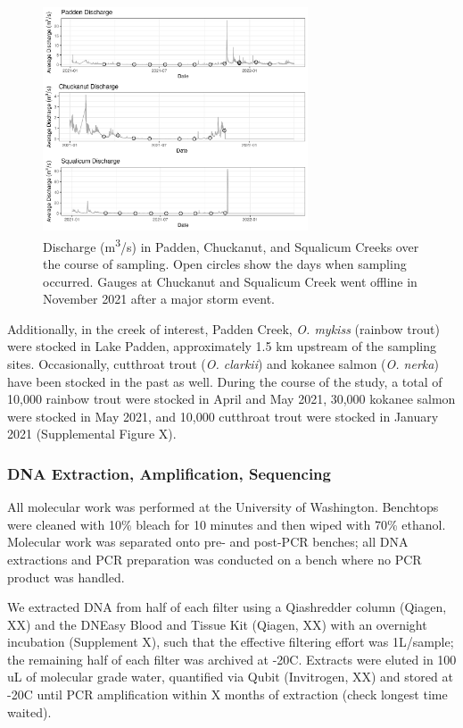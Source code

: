 \documentclass[
]{article}
\begin{document}
\begin{figure}
\centering
\includegraphics[width=0.7\textwidth,height=\textheight]{../Output/Figures/flow_gauges.png}
\caption{Discharge (m\textsuperscript{3}/s) in Padden, Chuckanut, and
Squalicum Creeks over the course of sampling. Open circles show the days
when sampling occurred. Gauges at Chuckanut and Squalicum Creek went
offline in November 2021 after a major storm event.}
\end{figure}

Additionally, in the creek of interest, Padden Creek, \emph{O. mykiss}
(rainbow trout) were stocked in Lake Padden, approximately 1.5 km
upstream of the sampling sites. Occasionally, cutthroat trout (\emph{O.
clarkii}) and kokanee salmon (\emph{O. nerka}) have been stocked in the
past as well. During the course of the study, a total of 10,000 rainbow
trout were stocked in April and May 2021, 30,000 kokanee salmon were
stocked in May 2021, and 10,000 cutthroat trout were stocked in January
2021 (Supplemental Figure X).

\hypertarget{dna-extraction-amplification-sequencing}{%
\subsubsection{DNA Extraction, Amplification,
Sequencing}\label{dna-extraction-amplification-sequencing}}

All molecular work was performed at the University of Washington.
Benchtops were cleaned with 10\% bleach for 10 minutes and then wiped
with 70\% ethanol. Molecular work was separated onto pre- and post-PCR
benches; all DNA extractions and PCR preparation was conducted on a
bench where no PCR product was handled.

We extracted DNA from half of each filter using a Qiashredder column
(Qiagen, XX) and the DNEasy Blood and Tissue Kit (Qiagen, XX) with an
overnight incubation (Supplement X), such that the effective filtering
effort was 1L/sample; the remaining half of each filter was archived at
-20\degree C. Extracts were eluted in 100 uL of molecular grade water,
quantified via Qubit (Invitrogen, XX) and stored at -20\degree C until
PCR amplification within X months of extraction (check longest time
waited).
\end{document}
